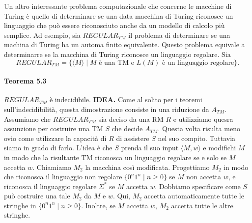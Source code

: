 \documentclass{article}
\begin{document}
Un altro interessante problema computazionale che concerne le macchine di Turing è quello di determinare se una data macchina di Turing riconosce un linguaggio che può essere riconosciuto anche da un modello di calcolo più semplice.
Ad esempio, sia $REGULAR_{TM}$ il problema di determinare se una machina di Turing ha un automa finito equivalente.
Questo problema equivale a determinarre se la macchina di Turing riconosce un linguaggio regolare.
Sia
$$
REGULAR_{TM} = \{\langle M \rangle \mid M \text{ è una TM e } L(M) \text{ è un linguaggio regolare} \}.
$$
\paragraph{Teorema 5.3}
\label{teorema-5.3}
\text{}
\newline
$REGULAR_{TM}$ è indecidibile.
\vspace{1em}
\text{}
\newline
\hbox{\textbf{IDEA.}} 
Come al solito per i teoremi sull'indecidibilità, questa dimostrazione consiste in una riduzione da $A_{TM}$.
Assumiamo che $REGULAR_{TM}$ sia deciso da una RM $R$ e utilizziamo quesra assunzione per costruire una TM $S$ che decide $A_{TM}$.
Questa volta risulta meno ovio come utilizzare la capacità di $R$ di assistere $S$ nel suo compito.
Tuttavia siamo in grado di farlo.
L'idea è che $S$ prenda il suo input $\langle M,w \rangle$ e modifichi $M$ in modo che la risultante TM riconosca un linguaggio regolare se e solo se $M$ accetta $w$.
Chiamiamo $M_2$ la macchina così modificata. Progettiamo $M_2$ in modo che riconosca il linguaggio non regolare $\{0^n1^n \mid n \geq 0\}$ se $M$ non accetta $w$, e riconosca il linguaggio regolare $\Sigma^*$ se $M$ accetta $w$.
Dobbiamo specificare come $S$ può costruire una tale $M_2$ da $M$ e $w$.
Qui, $M_2$ accetta automaticamente tutte le stringhe in $\{0^n1^n \mid n \geq 0\}$.
Inoltre, se $M$ accetta $w$, $M_2$ accetta tutte le altre stringhe.
\end{document}
